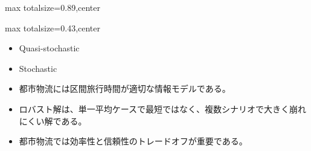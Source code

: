 \begin{minipage}[t]{0.58\textwidth}
\begin{adjustbox}{max totalsize={\textwidth}{0.89\textheight},center}
\begin{minipage}{\textwidth}
\end{minipage}
\end{adjustbox}
\end{minipage}


\clearpage
{}
\begin{minipage}[t]{0.405\textwidth}
\begin{adjustbox}{max totalsize={\textwidth}{0.43\textheight},center}
\begin{minipage}{\textwidth}\scriptsize
{}\begin{itemize}
\item Quasi-stochastic
\item Stochastic
\item 都市物流には区間旅行時間が適切な情報モデルである。
\end{itemize}\begin{itemize}
\item ロバスト解は、単一平均ケースで最短ではなく、複数シナリオで大きく崩れにくい解である。
\item 都市物流では効率性と信頼性のトレードオフが重要である。
\end{itemize}
\end{minipage}
\end{adjustbox}
\end{minipage}\hfill
